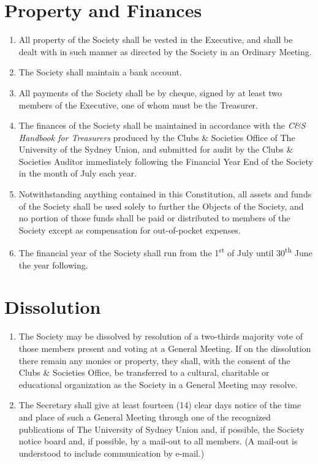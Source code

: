 \documentclass[11pt]{article}
\begin{document}
\section{Property and Finances}
\begin{enumerate}[\thesection .1]
    \item All property of the Society shall be vested in the Executive, and shall be dealt with in such manner as directed by the Society in an Ordinary Meeting.
    \item The Society shall maintain a bank account.
    \item All payments of the Society shall be by cheque, signed by at least two members of the Executive, one of whom must be the Treasurer.
    \item The finances of the Society shall be maintained in accordance with the \textit{C\&S Handbook for Treasurers} produced by the Clubs \& Societies Office of The University of the Sydney Union, and submitted for audit by the Clubs \& Societies Auditor immediately following the Financial Year End of the Society in the month of July each year.
    \item Notwithstanding anything contained in this Constitution, all assets and funds of the Society shall be used solely to further the Objects of the Society, and no portion of those funds shall be paid or distributed to members of the Society except as compensation for out-of-pocket expenses.
    \item The financial year of the Society shall run from the 1\textsuperscript{st} of July until 30\textsuperscript{th} June the year following.	
\end{enumerate}


\section{Dissolution}
\begin{enumerate}[\thesection .1]
    \item The Society may be dissolved by resolution of a two-thirds majority vote of those members present and voting at a General Meeting. If on the dissolution there remain any monies or property, they shall, with the consent of the Clubs \& Societies Office, be transferred to a cultural, charitable or educational organization as the Society in a General Meeting may resolve.
    \item The Secretary shall give at least fourteen (14) clear days notice of the time and place of such a General Meeting through one of the recognized publications of The University of Sydney Union and, if possible, the Society notice board and, if possible, by a mail-out to all members. (A mail-out is understood to include communication by e-mail.)
\end{enumerate}
\end{document}
